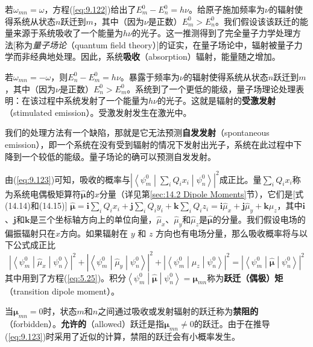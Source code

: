     若$\omega_{mn} = \omega$，方程(\ref{eq:9.122})给出了$E_m^0 - E_n^0 = h\nu$。给原子施加频率为$\nu$的辐射使得系统从状态$n$跃迁到$m$，其中（因为$\nu$是正数）$E_m^0 > E_n^0$。我们假设该该跃迁的能量来源于系统吸收了一个能量为$h\nu$的光子。这一推测得到了完全量子力学处理方法[称为\textit{量子场论}（quantum field theory）]的证实，在量子场论中，辐射被量子力学而非经典地处理。因此，系统\textbf{吸收}（absorption）辐射，能量随之增加。

    若$\omega_{mn} = -\omega$，则$E_n^0 - E_m^0 = h\nu$。暴露于频率为$\nu$的辐射使得系统从状态$n$跃迁到$m$，其中（因为$\nu$是正数）$E_n^0 > E_m^0$。系统到了一个更低的能级，量子场理论处理表明：在该过程中系统发射了一个能量为$h\nu$的光子。这就是辐射的\textbf{受激发射}（stimulated emission）。受激发射发生在激光中。

    我们的处理方法有一个缺陷，那就是它无法预测\textbf{自发发射}（spontaneous emission），即一个系统在没有受到辐射的情况下发射出光子，系统在此过程中下降到一个较低的能级。量子场论的确可以预测自发发射。

    由(\ref{eq:9.123})可知，吸收的概率与$\left|\left\langle \psi_m^0 \middle| \sum_i Q_i x_i \middle| \psi_n^0 \right\rangle\right|^2$成正比。量$\sum_iQ_ix_i$称为系统电偶极矩算符$\hat{\symbf{\mu}}$的$x$分量（详见第\ref{sec:14.2 Dipole Moments}节），它们是[式(14.14)和(14.15)]
    $\hat{\symbf{\mu}} = \mathbf{i}\sum_i Q_i x_i + \mathbf{j}\sum_i Q_i y_i + \mathbf{k}\sum_i Q_i z_i = \mathbf{i}\hat{\mu}_x + \mathbf{j}\hat{\mu}_y + \mathbf{k}\hat{\mu}_z$，其中$\mathbf{i}$、$\mathbf{j}$和$\mathbf{k}$是三个坐标轴方向上的单位向量，$\hat{\mu}_x$、$\hat{\mu}_y$和$\hat{\mu}_z$是$\symbf{\hat{\mu}}$的分量。我们假设电场的偏振辐射只在$x$方向。如果辐射在 $y$ 和 $z$ 方向也有电场分量，那么吸收概率将与以下公式成正比
    \begin{equation*}
        \left|\left\langle \psi_m^0 \middle| \hat{\mu}_x \middle| \psi_n^0 \right\rangle\right|^2 + \left|\left\langle \psi_m^0 \middle| \hat{\mu}_y \middle| \psi_n^0 \right\rangle\right|^2 + \left|\left\langle \psi_m^0 \middle| \hat{\mu}_z \middle| \psi_n^0 \right\rangle\right|^2 = \left|\left\langle \psi_m^0 \middle| \hat{\symbf{\mu}} \middle| \psi_n^0 \right\rangle\right|^2
    \end{equation*}
    其中用到了方程(\ref{eq:5.25})。积分$\left\langle \psi_m^0 \middle| \symbf{\hat{\mu}} \middle| \psi_n^0 \right\rangle = \symbf{\mu}_{mn}$称为\textbf{跃迁（偶极）矩}（transition dipole moment）。

    当$\symbf{\mu}_{mn} = 0$时，状态$m$和$n$之间通过吸收或发射辐射的跃迁称为\textbf{禁阻的}（forbidden）。\textbf{允许的}（allowed）跃迁是指$\symbf{\mu}_{mn} \neq 0$的跃迁。由于在推导(\ref{eq:9.123})时采用了近似的计算，禁阻的跃迁会有小概率发生。

